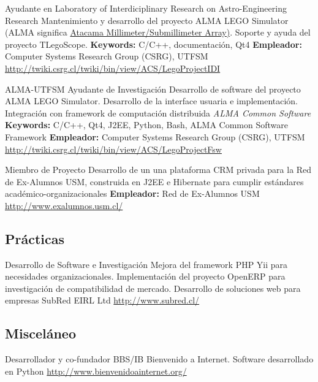 \documentclass[11pt,a4paper]{moderncv}
\begin{document}
        {Ayudante en Laboratory of Interdiciplinary Research on Astro-Engineering Research}
        {Mantenimiento y desarrollo del proyecto ALMA LEGO Simulator (ALMA significa \href{http://www.alma.cl/}{Atacama Millimeter/Submillimeter Array)}. Soporte y ayuda del proyecto TLegoScope.}
        {\textbf{Keywords:} C/C++, documentación, Qt4}
        {\textbf{Empleador:} Computer Systems Research Group (CSRG), UTFSM}
        {\url{http://twiki.csrg.cl/twiki/bin/view/ACS/LegoProjectIDI}}

        {ALMA-UTFSM Ayudante de Investigación}
        {Desarrollo de software del proyecto ALMA LEGO Simulator. Desarrollo de la interface usuaria e implementación. Integración con framework de computación distribuida \emph{ALMA Common Software}}
        {\textbf{Keywords:} C/C++, Qt4, J2EE, Python, Bash, ALMA Common Software Framework}
        {\textbf{Empleador:} Computer Systems Research Group (CSRG), UTFSM}
        {\url{http://twiki.csrg.cl/twiki/bin/view/ACS/LegoProjectFsw}}

        {Miembro de Proyecto}
        {Desarrollo de un una plataforma CRM privada para la Red de Ex-Alumnos USM, construida en J2EE e Hibernate para cumplir estándares académico-organizacionales}
        {\textbf{Empleador:} Red de Ex-Alumnos USM}
        {}
        {\url{http://www.exalumnos.usm.cl/}}


\subsection{Prácticas}


        {Desarrollo de Software e Investigación}
        {Mejora del framework PHP Yii para necesidades organizacionales. Implementación del proyecto OpenERP para investigación de compatibilidad de mercado. Desarrollo de soluciones web para empresas}
        {SubRed EIRL Ltd}
        {}
        {\url{http://www.subred.cl/}}


\subsection{Misceláneo}


        {Desarrollador y co-fundador}
        {BBS/IB Bienvenido a Internet. Software desarrollado en Python}
        {}
        {}
        {\url{http://www.bienvenidoainternet.org/}}
\end{document}
